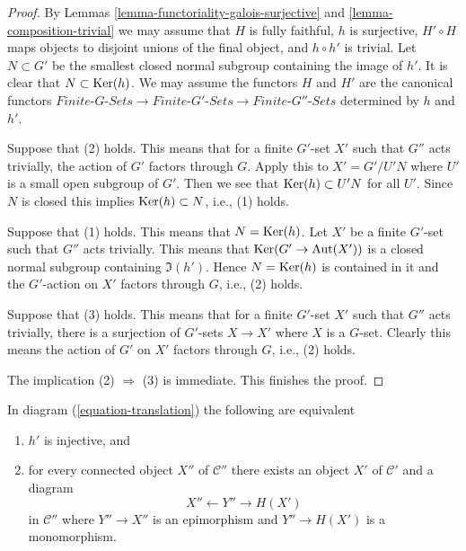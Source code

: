 \begin{proof}
By Lemmas \ref{lemma-functoriality-galois-surjective} and
\ref{lemma-composition-trivial} we may assume that
$H$ is fully faithful, $h$ is surjective, $H' \circ H$ maps
objects to disjoint unions of the final object, and $h \circ h'$
is trivial. Let $N \subset G'$ be the smallest closed normal
subgroup containing the image of $h'$. It is clear that
$N \subset \mathop{\mathrm{Ker}}(h)$.
We may assume the functors $H$ and $H'$ are the canonical functors
$\textit{Finite-}G\textit{-Sets} \to \textit{Finite-}G'\textit{-Sets}
\to \textit{Finite-}G''\textit{-Sets}$ determined by $h$ and $h'$.

\medskip\noindent
Suppose that (2) holds. This means that for a finite $G'$-set $X'$
such that $G''$ acts trivially, the action of $G'$ factors through $G$.
Apply this to $X' = G'/U'N$ where $U'$ is a small open subgroup of $G'$.
Then we see that $\mathop{\mathrm{Ker}}(h) \subset U'N$ for all $U'$. Since $N$ is closed
this implies $\mathop{\mathrm{Ker}}(h) \subset N$, i.e., (1) holds.

\medskip\noindent
Suppose that (1) holds. This means that $N = \mathop{\mathrm{Ker}}(h)$. Let $X'$ be a
finite $G'$-set such that $G''$ acts trivially. This means that
$\mathop{\mathrm{Ker}}(G' \to \text{Aut}(X'))$ is a closed normal subgroup containing
$\Im(h')$. Hence $N = \mathop{\mathrm{Ker}}(h)$ is contained in it and the $G'$-action
on $X'$ factors through $G$, i.e., (2) holds.

\medskip\noindent
Suppose that (3) holds. This means that for a finite $G'$-set $X'$
such that $G''$ acts trivially, there is a surjection of $G'$-sets
$X \to X'$ where $X$ is a $G$-set. Clearly this means the action of
$G'$ on $X'$ factors through $G$, i.e., (2) holds.

\medskip\noindent
The implication (2) $\Rightarrow$ (3) is immediate. This finishes the proof.
\end{proof}

\begin{lemma}
\label{lemma-functoriality-galois-injective}
In diagram (\ref{equation-translation}) the following are equivalent
\begin{enumerate}
\item $h'$ is injective, and
\item for every connected object $X''$ of $\mathcal{C}''$
there exists an object $X'$ of $\mathcal{C}'$ and a diagram
$$
X'' \leftarrow Y'' \rightarrow H(X')
$$
in $\mathcal{C}''$ where $Y'' \to X''$ is an epimorphism and
$Y'' \to H(X')$ is a monomorphism.
\end{enumerate}
\end{lemma}

